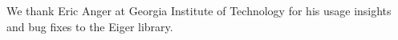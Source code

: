 We thank Eric Anger at Georgia Institute of Technology for his usage insights and bug fixes to the Eiger library.
